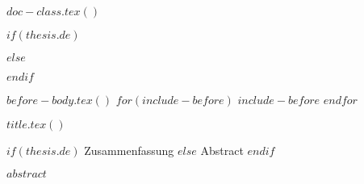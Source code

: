 $doc-class.tex()$

$if(thesis.de)$
\usepackage[english, ngerman]{babel}
$else$
\usepackage[ngerman, english]{babel}
$endif$

\usepackage[utf8]{inputenc}
\usepackage[T1]{fontenc}
\usepackage[babel]{csquotes}
\usepackage[style=alphabetic, backend=bibtex]{biblatex}
\usepackage{mathptmx}
\usepackage[scaled=0.92]{helvet}
\usepackage{courier}
\usepackage[calc]{datetime2}
\usepackage{amsmath}
\makeatletter
\def\displaymath{\typeout{*** Do not use DISPLAYMATH. Use \[...\] instead ***}}
\def\eqnarray{\typeout{*** Do not use EQNARRAY(*). Use align(*)-environment instead ***}}
\makeatother
\usepackage{amsfonts}
\usepackage{amstext}
\usepackage{color}
\usepackage{graphicx}
\usepackage{ifpdf}
\usepackage{iflang}
\usepackage{makeidx}
\usepackage{nomencl}
\usepackage{setspace}
\usepackage{lscape}
\usepackage{tabularx}
\usepackage{booktabs}
\usepackage{todonotes}
\usepackage{listings}
\usepackage[%
    binary-units=true,
    per-mode=symbol,
    exponent-product=\cdot,
    range-units=single,
    exponent-to-prefix=true,
    zero-decimal-to-integer=true,
    list-units=single
    ]{siunitx}

\usepackage[plainpages=false,pdfpagelabels]{hyperref}
\usepackage[german]{cleveref}

\def\mauve{0}
\def\graffi{1}



\ifpdf
\else   
\fi



\listfiles
\makeindex


$before-body.tex()$
$for(include-before)$
$include-before$
$endfor$

\frontmatter
$title.tex()$

\cleardoublepage

\begin{center}
    \huge
    $if(thesis.de)$
    Zusammenfassung
    $else$
    Abstract
    $endif$
\end{center}
$abstract$

